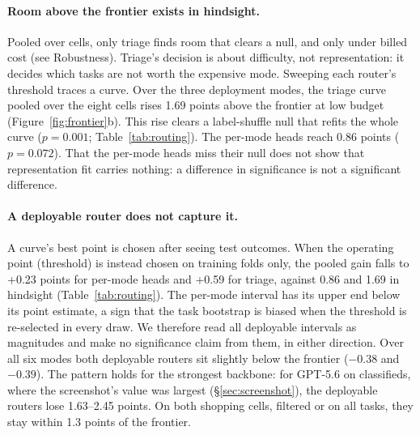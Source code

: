 

\paragraph{Room above the frontier exists in hindsight.} Pooled over cells, only triage finds room that clears a null, and only under billed cost (see Robustness). Triage's decision is about difficulty, not representation: it decides which tasks are not worth the expensive mode. Sweeping each router's threshold traces a curve. Over the three deployment modes, the triage curve pooled over the eight cells rises 1.69 points above the frontier at low budget (Figure~\ref{fig:frontier}b). This rise clears a label-shuffle null that refits the whole curve ($p=0.001$; Table~\ref{tab:routing}). The per-mode heads reach 0.86 points ($p=0.072$). That the per-mode heads miss their null does not show that representation fit carries nothing: a difference in significance is not a significant difference.

\paragraph{A deployable router does not capture it.} A curve's best point is chosen after seeing test outcomes. When the operating point (threshold) is instead chosen on training folds only, the pooled gain falls to +0.23 points for per-mode heads and +0.59 for triage, against 0.86 and 1.69 in hindsight (Table~\ref{tab:routing}). The per-mode interval has its upper end below its point estimate, a sign that the task bootstrap is biased when the threshold is re-selected in every draw. We therefore read all deployable intervals as magnitudes and make no significance claim from them, in either direction. Over all six modes both deployable routers sit slightly below the frontier ($-0.38$ and $-0.39$). %
The pattern holds for the strongest backbone: for GPT-5.6 on classifieds, where the screenshot's value was largest (\S\ref{sec:screenshot}), the deployable routers lose 1.63--2.45 points. On both shopping cells, filtered or on all tasks, they stay within 1.3 points of the frontier.

